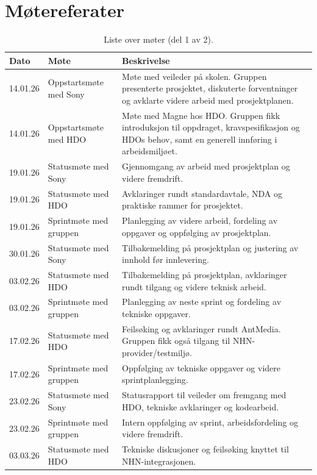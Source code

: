 \chapter{Møtereferater}
\label{app:motereferater}

\begin{table}[htbp]
\centering
\caption{Liste over møter (del 1 av 2).}
\label{tab:moteliste}
\small
\begin{tabular}{|p{2.2cm}|p{4.5cm}|p{6.5cm}|}
\hline
\textbf{Dato} & \textbf{Møte} & \textbf{Beskrivelse} \\
\hline
14.01.26 & Oppstartsmøte med Sony & Møte med veileder på skolen. Gruppen presenterte prosjektet, diskuterte forventninger og avklarte videre arbeid med prosjektplanen. \\
\hline
14.01.26 & Oppstartsmøte med HDO & Møte med Magne hos HDO. Gruppen fikk introduksjon til oppdraget, kravspesifikasjon og HDOs behov, samt en generell innføring i arbeidsmiljøet. \\
\hline
19.01.26 & Statusmøte med Sony & Gjennomgang av arbeid med prosjektplan og videre fremdrift. \\
\hline
19.01.26 & Statusmøte med HDO & Avklaringer rundt standardavtale, NDA og praktiske rammer for prosjektet. \\
\hline
19.01.26 & Sprintmøte med gruppen & Planlegging av videre arbeid, fordeling av oppgaver og oppfølging av prosjektplan. \\
\hline
30.01.26 & Statusmøte med Sony & Tilbakemelding på prosjektplan og justering av innhold før innlevering. \\
\hline
03.02.26 & Statusmøte med HDO & Tilbakemelding på prosjektplan, avklaringer rundt tilgang og videre teknisk arbeid. \\
\hline
03.02.26 & Sprintmøte med gruppen & Planlegging av neste sprint og fordeling av tekniske oppgaver. \\
\hline
17.02.26 & Statusmøte med HDO & Feilsøking og avklaringer rundt AntMedia. Gruppen fikk også tilgang til NHN-provider/testmiljø. \\
\hline
17.02.26 & Sprintmøte med gruppen & Oppfølging av tekniske oppgaver og videre sprintplanlegging. \\
\hline
23.02.26 & Statusmøte med Sony & Statusrapport til veileder om fremgang med HDO, tekniske avklaringer og kodearbeid. \\
\hline
23.02.26 & Sprintmøte med gruppen & Intern oppfølging av sprint, arbeidsfordeling og videre fremdrift. \\
\hline
03.03.26 & Statusmøte med HDO & Tekniske diskusjoner og feilsøking knyttet til NHN-integrasjonen. \\
\hline
\end{tabular}
\end{table}


